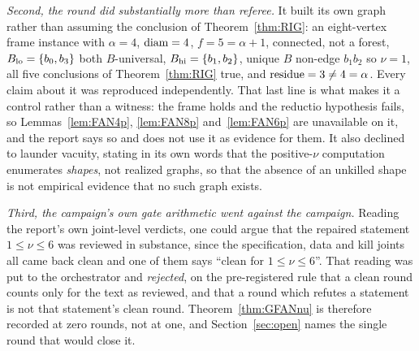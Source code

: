 \emph{Second, the round did substantially more than referee.} It built its own graph rather
than assuming the conclusion of Theorem~\ref{thm:RIG}: an eight-vertex frame instance with
$\alpha = 4$, $\operatorname{diam} = 4$, $f = 5 = \alpha+1$, connected, not a forest,
$B_{\mathrm{lo}} = \{b_0,b_3\}$ both $B$-universal, $B_{\mathrm{hi}} = \{b_1,b_2\}$, unique $B$ non-edge
$b_1b_2$ so $\nu = 1$, all five conclusions of Theorem~\ref{thm:RIG} true, and
$\operatorname{residue} = 3 \ne 4 = \alpha$. Every claim about it was reproduced independently. That last line
is what makes it a control rather than a witness: the frame holds and the reductio
hypothesis fails, so Lemmas~\ref{lem:FAN4p}, \ref{lem:FAN8p} and~\ref{lem:FAN6p} are
unavailable on it, and the report says so and does not use it as evidence for them.
It also declined to launder vacuity, stating in its own words that the positive-$\nu$
computation enumerates \emph{shapes}, not realized graphs, so that the absence of an
unkilled shape is not empirical evidence that no such graph exists.

\emph{Third, the campaign's own gate arithmetic went against the campaign.} Reading the
report's own joint-level verdicts, one could argue that the repaired statement
$1 \le \nu \le 6$ was reviewed in substance, since the specification, data and kill joints
all came back clean and one of them says ``clean for $1 \le \nu \le 6$''. That reading was
put to the orchestrator and \emph{rejected}, on the pre-registered rule that a clean round
counts only for the text as reviewed, and that a round which refutes a statement is not that
statement's clean round. Theorem~\ref{thm:GFANnu} is therefore recorded at zero rounds, not
at one, and Section~\ref{sec:open} names the single round that would close it.

